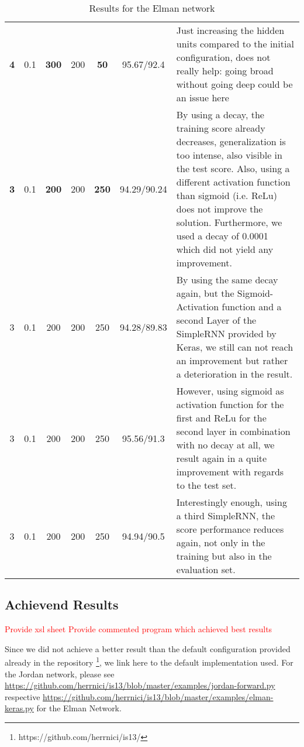 \documentclass[a4paper]{article}
\begin{document}
\begin{sidewaystable}
\begin{tabular}{ccccccp{8cm}}
\textbf{4}     & 0.1                    & \textbf{300}          & 200                           & \textbf{50}     & 95.67/92.4            & Just increasing the hidden units compared to the initial configuration, does not really help: going broad without going deep could be an issue here                                                                                                                                                    \\
\textbf{3}     & 0.1                    & \textbf{200}          & 200                           & \textbf{250}    & 94.29/90.24           & By using a decay, the training score already decreases, generalization is too intense, also visible in the test score. Also, using a different activation function than sigmoid (i.e. ReLu) does not improve the solution. Furthermore, we used a decay of 0.0001 which did not yield any improvement. \\
3              & 0.1                    & 200                   & 200                           & 250             & 94.28/89.83           & By using the same decay again, but the Sigmoid-Activation function and a second Layer of the SimpleRNN provided by Keras, we still can not reach an improvement but rather a deterioration in the result.                                                                                              \\
3              & 0.1                    & 200                   & 200                           & 250             & 95.56/91.3            & However, using sigmoid as activation function for the first and ReLu for the second layer in combination with no decay at all, we result again in a quite improvement with regards to the test set.                                                                                                    \\
3              & 0.1                    & 200                   & 200                           & 250             & 94.94/90.5            & Interestingly enough, using a third SimpleRNN, the score performance reduces again, not only in the training but also in the evaluation set.                                                                                                                                                          
\end{tabular}
\caption{Results for the Elman network}
\label{table:rnn-results-elman}
\end{sidewaystable}

\subsection{Achievend Results}
\textcolor{red}{Provide xsl sheet}
\textcolor{red}{Provide commented program which achieved best results}

Since we did not achieve a better result than the default configuration provided
already in the repository \footnote{https://github.com/herrnici/is13/}, we link here to the default implementation used. For the Jordan network, please see \url{https://github.com/herrnici/is13/blob/master/examples/jordan-forward.py} respective \url{https://github.com/herrnici/is13/blob/master/examples/elman-keras.py} for the Elman Network.
\end{document}
